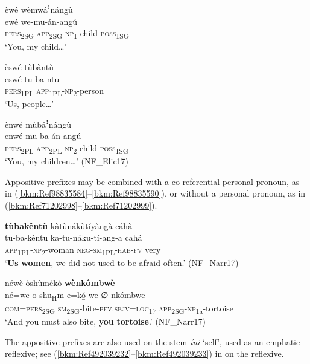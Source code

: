 \ea
èwé wèmwáꜝnángù\\
\gll ewé    we-mu-án-angú\\
\textsc{pers}\textsubscript{2SG}  \textsc{app}\textsubscript{2SG}-\textsc{np}\textsubscript{1}-child-\textsc{poss}\textsubscript{1SG}\\
\glt ‘You, my child…’
\z

\ea
èswé tùbàntù\\
\gll eswé    tu-ba-ntu\\
\textsc{pers}\textsubscript{1PL}  \textsc{app}\textsubscript{1PL}-\textsc{np}\textsubscript{2}-person\\
\glt ‘Us, people…’
\z

\ea
\label{bkm:Ref98835590}
ènwé mùbáꜝnángù\\
\gll enwé    mu-ba-án-angú\\
\textsc{pers}\textsubscript{2PL}  \textsc{app}\textsubscript{2PL}-\textsc{np}\textsubscript{2}-child-\textsc{poss}\textsubscript{1SG}\\
\glt ‘You, my children…’ (NF\_Elic17)
\z

Appositive prefixes may be combined with a co-referential personal pronoun, as in (\ref{bkm:Ref98835584}--\ref{bkm:Ref98835590}), or without a personal pronoun, as in (\ref{bkm:Ref71202998}--\ref{bkm:Ref71202999}).

\ea
\label{bkm:Ref71202998}
\textbf{tùbakêntù} kàtùnákùtíyàngà cáhà\\
\gll tu-ba-kéntu    ka-tu-náku-tí-ang-a  cahá\\
\textsc{app}\textsubscript{1PL}-\textsc{np}\textsubscript{2}-woman  \textsc{neg}-\textsc{sm}\textsubscript{1PL}-\textsc{hab}-\textsc{fv}    very\\
\glt ‘\textbf{Us} \textbf{women}, we did not used to be afraid often.’ (NF\_Narr17)
\z

\ea
\label{bkm:Ref71202999}
néwè òshùmékò \textbf{wènkômbwè}\\
\gll né=we    o-shu\textsubscript{H}m-e=kó̲    we-∅-nkómbwe\\
\textsc{com}=\textsc{pers}\textsubscript{2SG}  \textsc{sm}\textsubscript{2SG}-bite-\textsc{pfv}.\textsc{sbjv}=\textsc{loc}\textsubscript{17}  \textsc{app}\textsubscript{2SG}-\textsc{np}\textsubscript{1a}-tortoise\\
\glt ‘And you must also bite, \textbf{you} \textbf{tortoise}.’ (NF\_Narr17)
\z

The appositive prefixes are also used on the stem \textit{íni} ‘self’, used as an emphatic reflexive; see (\ref{bkm:Ref492039232}--\ref{bkm:Ref492039233}) in  on the reflexive.

